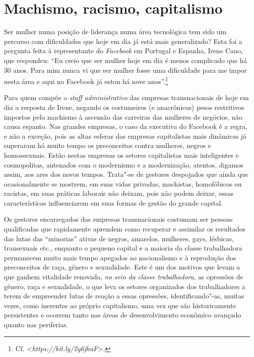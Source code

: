 \chapter{Machismo, racismo, capitalismo}

Ser mulher numa posição de liderança numa área tecnológica tem sido um
percurso com dificuldades que hoje em dia já está mais generalizado?
Esta foi a pergunta feita à representante do \emph{Facebook} em Portugal
e Espanha, Irene Cano, que respondeu: ``Eu creio que ser mulher hoje em
dia é menos complicado que há 30 anos. Para mim nunca vi que ser mulher
fosse uma dificuldade para me impor nesta área e aqui no Facebook já
estou há nove anos''.\footnote{Cf. \textless{}\emph{https://bit.ly/2y6jhuF}\textgreater{}.}

Para quem compõe o \emph{staff administrativo} das empresas
transnacionais de hoje em dia a resposta de Irene, negando os
costumeiros (e anacrônicos) pesos restritivos impostos pelo machismo à
ascensão das carreiras das mulheres de negócios, não causa espanto. Nas
grandes empresas, o caso da executiva do Facebook é a regra, e não a
exceção, pois as altas esferas das empresas capitalistas mais dinâmicas
já superaram há muito tempo os preconceitos contra mulheres, negros e
homossexuais. Estão nestas empresas os setores capitalistas mais
inteligentes e cosmopolitas, antenados com o modernismo e a
modernização, atentos, digamos assim, aos ares dos novos tempos.
Trata"-se de gestores despojados que ainda que ocasionalmente se mostrem,
em suas vidas privadas, machistas, homofóbicos ou racistas, em suas
práticas laborais não deixam, pois não podem deixar, essas
características influenciarem em suas formas de gestão do grande
capital.

Os gestores encarregados das empresas transnacionais costumam ser
pessoas qualificadas que rapidamente aprendem como recuperar e assimilar
os resultados das lutas das ``minorias'' ativas de negros, amarelos,
mulheres, gays, lésbicas, transexuais etc., enquanto o pequeno capital e
a maioria da classe trabalhadora permanecem muito mais tempo apegados ao
nacionalismo e à reprodução dos preconceitos de raça, gênero e
sexualidade. Este é um dos motivos que levam a que ganhem vitalidade
renovada, \emph{no seio da classe trabalhadora}, as opressões de gênero,
raça e sexualidade, o que leva os setores organizados dos trabalhadores
a terem de empreender lutas de reação a essas opressões,
identificando"-as, muitas vezes, como inerentes ao próprio capitalismo,
uma vez que são historicamente persistentes e ocorrem tanto nas áreas de
desenvolvimento econômico avançado quanto nas periferias.


